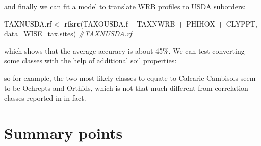 \documentclass[11pt]{krantz}
\newenvironment{Shaded}{\begin{snugshade}}{\end{snugshade}}
\newcommand{\CommentTok}[1]{\textcolor[rgb]{0.37,0.37,0.37}{\textit{#1}}}
\newcommand{\DataTypeTok}[1]{\textcolor[rgb]{0.27,0.27,0.27}{#1}}
\newcommand{\DecValTok}[1]{\textcolor[rgb]{0.06,0.06,0.06}{#1}}
\newcommand{\FloatTok}[1]{\textcolor[rgb]{0.06,0.06,0.06}{#1}}
\newcommand{\KeywordTok}[1]{\textcolor[rgb]{0.27,0.27,0.27}{\textbf{#1}}}
\newcommand{\NormalTok}[1]{#1}
\newcommand{\OperatorTok}[1]{\textcolor[rgb]{0.43,0.43,0.43}{\textbf{#1}}}
\newcommand{\StringTok}[1]{\textcolor[rgb]{0.5,0.5,0.5}{#1}}
\theoremstyle{definition}
\theoremstyle{definition}
\theoremstyle{definition}
\theoremstyle{remark}
\begin{document}
and finally we can fit a model to translate WRB profiles to USDA
suborders:

\begin{Shaded}
\begin{Highlighting}[]
\NormalTok{TAXNUSDA.rf <-}\StringTok{ }\KeywordTok{rfsrc}\NormalTok{(TAXOUSDA.f }\OperatorTok{~}\StringTok{ }\NormalTok{TAXNWRB }\OperatorTok{+}\StringTok{ }\NormalTok{PHIHOX }\OperatorTok{+}\StringTok{ }\NormalTok{CLYPPT, }\DataTypeTok{data=}\NormalTok{WISE_tax.sites)}
\CommentTok{#TAXNUSDA.rf}
\end{Highlighting}
\end{Shaded}

which shows that the average accuracy is about 45\%. We can test
converting some classes with the help of additional soil properties:

\begin{Shaded}
\end{Shaded}

so for example, the two most likely classes to equate to Calcaric
Cambisols seem to be Ochrepts and Orthids, which is not that much
different from correlation classes reported in
\citet{Krasilnikov2009handbook} in fact.

\hypertarget{summary-points}{%
\section{Summary points}\label{summary-points}}
\end{document}
